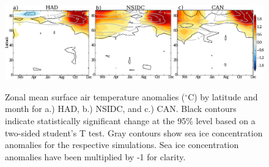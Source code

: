 \documentclass[twocol]{ametsoc}
\begin{document}
\begin{figure}[t]
  \noindent\includegraphics[width=39pc,angle=0]{SATwithlat.pdf}\\
  \caption{Zonal mean surface air temperature anomalies ($^\circ$C) by latitude and month for a.) HAD, b.) NSIDC, and c.) CAN. Black contours indicate statistically significant change at the 95\% level based on a two-sided student's T test. Gray contours show sea ice concentration anomalies for the respective simulations. Sea ice concentration anomalies have been multiplied by -1 for clarity.
}\label{fig:f1b}
\end{figure}
\end{document}
